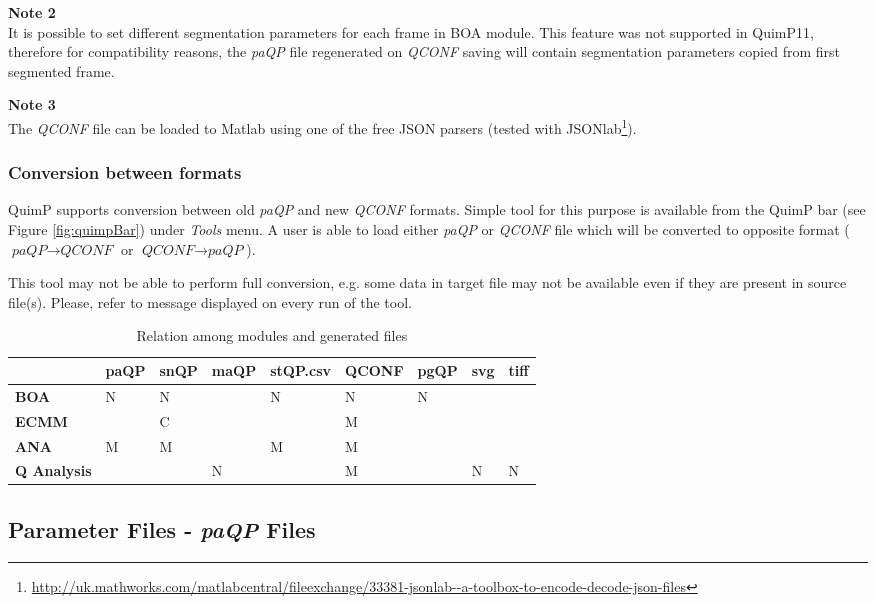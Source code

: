 \documentclass[a4paper,12pt]{article}
\begin{document}
\textbf{Note 2} \\
It is possible to set different segmentation parameters for each frame in BOA module. This feature was not supported in QuimP11, therefore for compatibility reasons, the \textit{paQP} file regenerated on \textit{QCONF} saving will contain segmentation parameters copied from first segmented frame.

\textbf{Note 3} \\
The \textit{QCONF} file can be loaded to Matlab using one of the free JSON parsers (tested with JSONlab\footnote{\url{http://uk.mathworks.com/matlabcentral/fileexchange/33381-jsonlab--a-toolbox-to-encode-decode-json-files}}).

\subsubsection{Conversion between formats}
QuimP supports conversion between old \textit{paQP} and new \textit{QCONF} formats. Simple tool for this purpose is available from the QuimP bar (see Figure \ref{fig:quimpBar}) under \textit{Tools} menu. A user is able to load either \textit{paQP} or \textit{QCONF} file which will be converted to opposite format ($\textit{paQP} \rightarrow \textit{QCONF}$ or $\textit{QCONF} \rightarrow \textit{paQP}$).

This tool may not be able to perform full conversion, e.g. some data in target file may not be available even if they are present in source file(s). Please, refer to message displayed on every run of the tool.   

\begin{table}[]
	\centering
	\caption{Relation among modules and generated files}
	\label{filestable}
	\begin{tabular}{|l|l|l|l|l|l|l|l|l|}
		&  \textbf{paQP}&  \textbf{snQP}&  \textbf{maQP}&  \textbf{stQP.csv}&  \textbf{QCONF}&  \textbf{pgQP}& \textbf{svg}&  \textbf{tiff}\\ \hline
		\textbf{BOA} &   N&  N&  &  N&  N&  N&  &  \\
		\textbf{ECMM}&    &  C&  &   &  M&   &  &  \\
		\textbf{ANA} &   M&  M&  &  M&  M&   &  &  \\
		\textbf{Q Analysis}&  &  &  N&  &  M&  &  N& N 
	\end{tabular}
\end{table}

  
\subsection{Parameter Files - \textit{paQP} Files}
\label{paQP}
\end{document}

